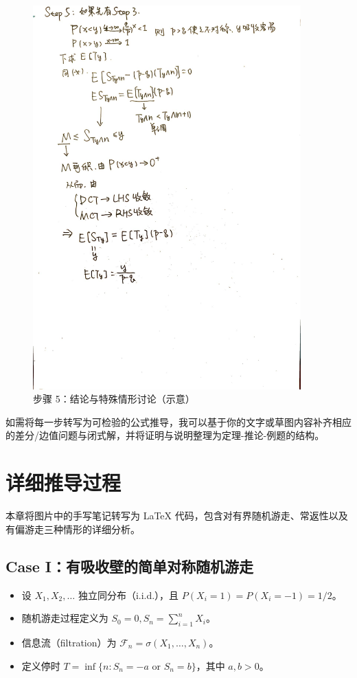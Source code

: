 \documentclass[12pt, a4paper, oneside, fontset=windows]{ctexbook}
\begin{document}
\begin{figure}[h]
	\centering
	\includegraphics[width=0.92\textwidth]{5.jpg}
	\caption{步骤 5：结论与特殊情形讨论（示意）}\label{fig:rw-step5}
\end{figure}

\vspace{1em}
\noindent
如需将每一步转写为可检验的公式推导，我可以基于你的文字或草图内容补齐相应的差分/边值问题与闭式解，并将证明与说明整理为定理-推论-例题的结构。

\chapter{详细推导过程}
本章将图片中的手写笔记转写为 LaTeX 代码，包含对有界随机游走、常返性以及有偏游走三种情形的详细分析。

\section{Case I：有吸收壁的简单对称随机游走}
\begin{itemize}
    \item 设 $X_1, X_2, \dots$ 独立同分布（i.i.d.），且 $P(X_i=1) = P(X_i=-1) = 1/2$。
    \item 随机游走过程定义为 $\displaystyle S_0=0, S_n = \sum_{i=1}^n X_i$。
    \item 信息流（filtration）为 $\mathcal{F}_n = \sigma(X_1, \dots, X_n)$。
    \item 定义停时 $T = \inf\{n: S_n = -a \text{ or } S_n = b\}$，其中 $a,b > 0$。
\end{itemize}
\end{document}
